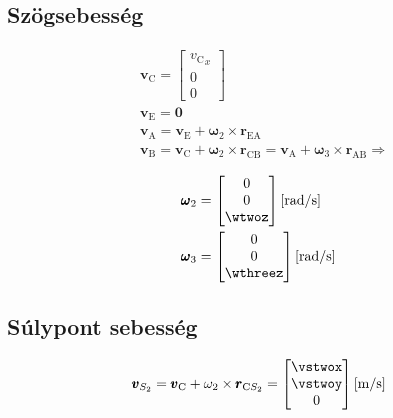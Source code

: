 \subsection{Szögsebesség}
\begin{align}
	&\pmb{v}_\text{C} = 
	\begin{bmatrix}
		{v_\text{C}}_x \\ 0 \\ 0
	\end{bmatrix} \\
	&\pmb{v}_\text{E} = \pmb{0} \\
	&\pmb{v}_\text{A} = \pmb{v}_\text{E} + \pmb{\omega}_2 \times \pmb{r}_\text{EA} \\
	&\pmb{v}_\text{B} = 
	\pmb{v}_\text{C} + \pmb{\omega}_2 \times \pmb{r}_\text{CB} = 
	\pmb{v}_\text{A} + \pmb{\omega}_3 \times \pmb{r}_\text{AB} \Rightarrow \\
\end{align}
\begin{align}
	&\pmb{\omega}_2 = 
	\begin{bmatrix}
		0 \\ 0 \\ \wtwoz
	\end{bmatrix} \siunit{}{\radian\per\second} \\
	&\pmb{\omega}_3 = 
	\begin{bmatrix}
		0 \\ 0 \\ \wthreez
	\end{bmatrix} \siunit{}{\radian\per\second}
\end{align}

\subsection{Súlypont sebesség}
\begin{equation}
	\pmb{v}_{S_2} = \pmb{v}_\text{C} + \omega_2 \times \pmb{r}_{\text{C}{S_2}} = 
	\begin{bmatrix}
		\vstwox \\ \vstwoy \\ 0
	\end{bmatrix} \siunit{}{\m\per\second}
\end{equation}

